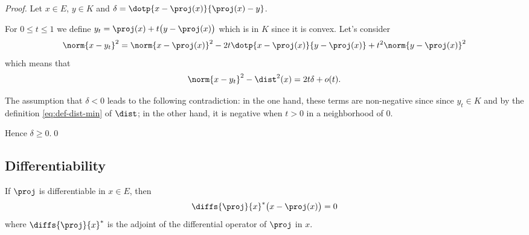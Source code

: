 \begin{proof}
  Let $x\in E$, $y\in K$ and $\delta=\dotp{x-\proj(x)}{\proj(x)-y}$.

  For $0\leq t\leq 1$ we define $y_t = \proj(x) + t\big(y-\proj(x)\big)$ which is in $K$ since it is convex.
  Let's consider
  \begin{equation*}
    \norm{x-y_t}^2 = \norm{x-\proj(x)}^2 - 2t\dotp{x-\proj(x)}{y-\proj(x)} + t^2\norm{y-\proj(x)}^2
  \end{equation*}
  which means that
  \begin{equation*}
    \norm{x-y_t}^2 - \dist^2(x) = 2t\delta + o(t).
  \end{equation*}

  The assumption that $\delta<0$ leads to the following contradiction:
  in the one hand, these terms are non-negative since since $y_t\in K$ and by the definition \eqref{eq:def-dist-min} of $\dist$;
  in the other hand, it is negative when $t>0$ in a neighborhood of $0$.

  Hence $\delta\geq 0$.\qed
\end{proof}


\subsection{Differentiability}

\begin{lemma}
  \label{thm:lemma-proj-orthogonal}
  If $\proj$ is differentiable in $x\in E$, then
  \begin{equation}
    \diffs{\proj}{x}^*\big(x-\proj (x)\big)=0
  \end{equation}
  where $\diffs{\proj}{x}^*$ is the adjoint of the differential operator of $\proj$ in $x$.
\end{lemma}

